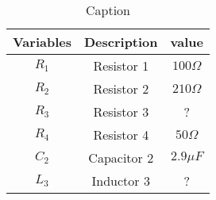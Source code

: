 \begin{table}[h]
\renewcommand\thetable{1}
    \centering
    \begin{tabular}{|c|c|c|}
    \hline
         Variables&Description&value  \\\hline
         $R_1$& Resistor 1 & $100\Omega$\\\hline
         $R_2$& Resistor 2 & $210\Omega$\\\hline
         $R_3$& Resistor 3 & ?\\\hline
         $R_4$& Resistor 4 & $50\Omega$\\\hline
         $C_2$& Capacitor 2& $2.9\mu F$\\\hline
         $L_3$& Inductor 3& ?\\\hline
    \end{tabular}
    \caption{Caption}
    \label{tab:1_IN_63}
\end{table}
